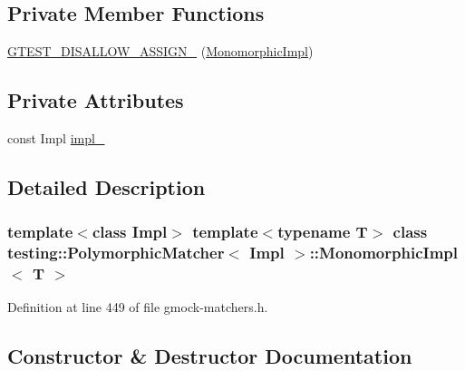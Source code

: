 \subsection*{Private Member Functions}
\begin{DoxyCompactItemize}
\item 
\hyperlink{classtesting_1_1PolymorphicMatcher_1_1MonomorphicImpl_a424d3467600758132de06097e3f7ffaa}{G\+T\+E\+S\+T\+\_\+\+D\+I\+S\+A\+L\+L\+O\+W\+\_\+\+A\+S\+S\+I\+G\+N\+\_\+} (\hyperlink{classtesting_1_1PolymorphicMatcher_1_1MonomorphicImpl}{Monomorphic\+Impl})
\end{DoxyCompactItemize}
\subsection*{Private Attributes}
\begin{DoxyCompactItemize}
\item 
const Impl \hyperlink{classtesting_1_1PolymorphicMatcher_1_1MonomorphicImpl_af444d0e547c2f5b0a5e553868c042330}{impl\+\_\+}
\end{DoxyCompactItemize}


\subsection{Detailed Description}
\subsubsection*{template$<$class Impl$>$\newline
template$<$typename T$>$\newline
class testing\+::\+Polymorphic\+Matcher$<$ Impl $>$\+::\+Monomorphic\+Impl$<$ T $>$}



Definition at line 449 of file gmock-\/matchers.\+h.



\subsection{Constructor \& Destructor Documentation}
\mbox{\label{classtesting_1_1PolymorphicMatcher_1_1MonomorphicImpl_a83b488f9db4ef0552949abdecc4eaf30}} 
